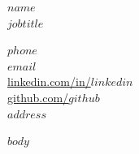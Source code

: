 \documentclass[a4paper,10pt]{article}
\begin{document}
\begin{center}
    \begin{minipage}[t]{0.6\textwidth}
        \raggedright
        {\huge \textbf{$name$}} \\ \vspace{1.0cm}%
        {\LARGE \textbf{$jobtitle$}} %
    \end{minipage}%
    \begin{minipage}[t]{0.4\textwidth}
        \raggedleft
        \href{tel:$phone$}{$phone$}\\ %
        \href{mailto:$email$}{$email$}\\ %
        \href{https://www.linkedin.com/in/$linkedin$}{linkedin.com/in/$linkedin$}\\ %
        \href{https://www.github.com/$github$}{github.com/$github$}\\ %
        $address$ \\ 
    \end{minipage}
\end{center}

\vspace{0.5cm} %

$body$

\end{document}
